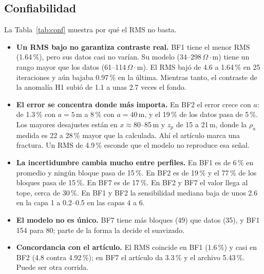 \documentclass[conference]{IEEEtran}
\newcommand{\ohmm}{\ensuremath{\Omega\!\cdot\!\mathrm{m}}}
\begin{document}
\subsection{Confiabilidad}
La Tabla~\ref{tab:conf} muestra por qu\'e el RMS no basta.
\begin{itemize}
\item \textbf{Un RMS bajo no garantiza contraste real.} BF1 tiene el menor RMS (1.64\,\%), pero sus datos casi no var\'ian. Su modelo (34--298\,\ohmm) tiene un rango mayor que los datos (61--114\,\ohmm). El RMS baj\'o de 4.6 a 1.64\,\% en 25 iteraciones y a\'un bajaba 0.97\,\% en la \'ultima. Mientras tanto, el contraste de la anomal\'ia H1 subi\'o de 1.1 a unas 2.7 veces el fondo.
\item \textbf{El error se concentra donde m\'as importa.} En BF2 el error crece con $a$: de 1.3\,\% con $a=5$\,m a 8\,\% con $a=40$\,m, y el 19\,\% de los datos pasa de 5\,\%. Los mayores desajustes est\'an en $x\approx 80$--85\,m y $z_p$ de 15 a 21\,m, donde la $\rho_a$ medida es 22 a 28\,\% mayor que la calculada. Ah\'i el art\'iculo marca una fractura. Un RMS de 4.9\,\% esconde que el modelo no reproduce esa se\~nal.
\item \textbf{La incertidumbre cambia mucho entre perfiles.} En BF1 es de 6\,\% en promedio y ning\'un bloque pasa de 15\,\%. En BF2 es de 19\,\% y el 77\,\% de los bloques pasa de 15\,\%. En BF7 es de 17\,\%. En BF2 y BF7 el valor llega al tope, cerca de 30\,\%. En BF1 y BF2 la sensibilidad mediana baja de unos 2.6 en la capa 1 a 0.2--0.5 en las capas 4 a 6.
\item \textbf{El modelo no es \'unico.} BF7 tiene m\'as bloques (49) que datos (35), y BF1 154 para 80; parte de la forma la decide el suavizado.
\item \textbf{Concordancia con el art\'iculo.} El RMS coincide en BF1 (1.6\,\%) y casi en BF2 (4.8 contra 4.92\,\%); en BF7 el art\'iculo da 3.3\,\% y el archivo 5.43\,\%. Puede ser otra corrida.
\end{itemize}
\end{document}
